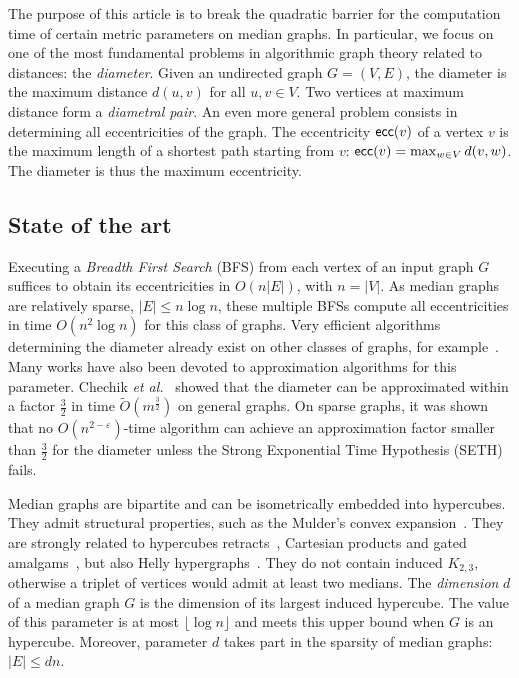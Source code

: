 \documentclass{article}
\newcommand{\card}[1]{\left| #1 \right|}
\newcommand{\ecc}{\mbox{\textsf{ecc}}}
\begin{document}
The purpose of this article is to break the quadratic barrier for the computation time of certain metric parameters on median graphs. In particular, we focus on one of the most fundamental problems in algorithmic graph theory related to distances: the \textit{diameter}. Given an undirected graph $G=(V,E)$, the diameter is the maximum distance $d(u,v)$ for all $u,v \in V$. Two vertices at maximum distance form a \textit{diametral pair}. An even more general problem consists in determining all eccentricities of the graph. The eccentricity $\ecc(v)$ of a vertex $v$ is the maximum length of a shortest path starting from $v$: $\ecc(v) = \max_{w \in V} d(v,w)$. The diameter is thus the maximum eccentricity.

\subsection{State of the art}

Executing a \textit{Breadth First Search} (BFS) from each vertex of an input graph $G$ suffices to obtain its eccentricities in $O(n\card{E})$, with $n = \card{V}$. As median graphs are relatively sparse, $\card{E} \le n\log n$, these multiple BFSs compute all eccentricities in time $O(n^2\log n)$ for this class of graphs.
Very efficient algorithms determining the diameter already exist on other classes of graphs, for example~\cite{AbWiWa16,Ca17,DuHaVi20}. Many works have also been devoted to approximation algorithms for this parameter. Chechik {\em et al.}~\cite{ChLaRoScTaWi14} showed that the diameter can be approximated within a factor $\frac{3}{2}$ in time $\tilde{O}(m^{\frac{3}{2}})$ on general graphs. On sparse graphs, it was shown~\cite{RoWi13} that no $O(n^{2-\varepsilon})$-time algorithm can achieve an approximation factor smaller than $\frac{3}{2}$ for the diameter unless the Strong Exponential Time Hypothesis (SETH) fails.

Median graphs are bipartite and can be isometrically embedded into hypercubes. They admit structural properties, such as the Mulder's convex expansion~\cite{Mu78,Mu80}. They are strongly related to hypercubes retracts~\cite{Ba84}, Cartesian products and gated amalgams~\cite{BaCh08}, but also Helly hypergraphs~\cite{MuSc79}. They do not contain induced $K_{2,3}$, otherwise a triplet of vertices would admit at least two medians. The \textit{dimension} $d$ of a median graph $G$ is the dimension of its largest induced hypercube. The value of this parameter is at most $\lfloor \log n \rfloor$ and meets this upper bound when $G$ is an hypercube. Moreover, parameter $d$ takes part in the sparsity of median graphs: $\card{E} \le dn$.
\end{document}
